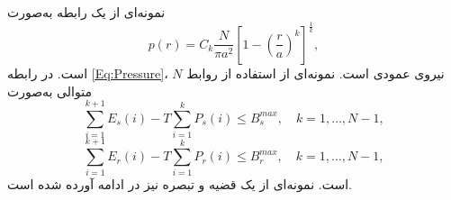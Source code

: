 نمونه‌ای از یک رابطه به‌صورت
\begin{equation}
p\left( r \right) = {C_k}\frac{N}{{\pi {a^2}}}{\left[{1 - {{\left( {\frac{r}{a}} \right)}^k}} \right]^{\frac{1}{k}}},
\label{Eq:Pressure}
\end{equation}
است. در رابطه
\ref{Eq:Pressure}،
$N$
نیروی عمودی است. نمونه‌ای از استفاده از روابط متوالی به‌صورت
\begin{equation}
\sum \limits_{i = 1}^{k + 1} {E_s}\left( i \right) - T \sum \limits_{i = 1}^k {P_s}\left( i \right) \le B_s^{max},\quad k = 1, \ldots ,N - 1,
\label{Eq:batterysource}
\end{equation}\vspace{-\baselineskip}
\begin{equation}
\sum \limits_{i = 1}^{k + 1} {E_r}\left( i \right) - T \sum \limits_{i = 1}^k {P_r}\left( i \right) \le B_r^{max},\quad k = 1, \ldots ,N - 1,
\label{Eq:batteryrellay}
\end{equation}
است. نمونه‌ای از یک قضیه و تبصره نیز در ادامه آورده شده است.
